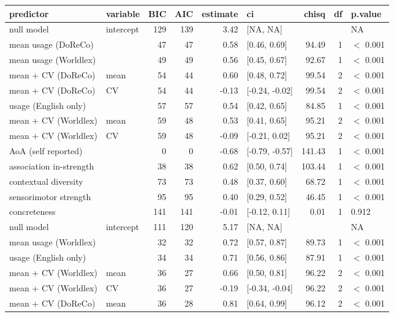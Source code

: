 \begin{table}[ht]
\centering
\begin{tabular}{llrrrlrrl}
  \hline
predictor & variable & BIC & AIC & estimate & ci & chisq & df & p.value \\ 
  \hline
null model & intercept & 129 & 139 & 3.42 & [NA, NA] &  &  & NA \\ 
  mean usage (DoReCo) &  & 47 & 47 & 0.58 & [0.46, 0.69] & 94.49 & 1 & $<$ 0.001 \\ 
  mean usage (Worldlex) &  & 49 & 49 & 0.56 & [0.45, 0.67] & 92.67 & 1 & $<$ 0.001 \\ 
  mean + CV (DoReCo) & mean & 54 & 44 & 0.60 & [0.48, 0.72] & 99.54 & 2 & $<$ 0.001 \\ 
  mean + CV (DoReCo) & CV & 54 & 44 & -0.13 & [-0.24, -0.02] & 99.54 & 2 & $<$ 0.001 \\ 
  usage (English only) &  & 57 & 57 & 0.54 & [0.42, 0.65] & 84.85 & 1 & $<$ 0.001 \\ 
  mean + CV (Worldlex) & mean & 59 & 48 & 0.53 & [0.41, 0.65] & 95.21 & 2 & $<$ 0.001 \\ 
  mean + CV (Worldlex) & CV & 59 & 48 & -0.09 & [-0.21, 0.02] & 95.21 & 2 & $<$ 0.001 \\ 
  AoA (self reported) &  & 0 & 0 & -0.68 & [-0.79, -0.57] & 141.43 & 1 & $<$ 0.001 \\ 
  association in-strength &  & 38 & 38 & 0.62 & [0.50, 0.74] & 103.44 & 1 & $<$ 0.001 \\ 
  contextual diversity &  & 73 & 73 & 0.48 & [0.37, 0.60] & 68.72 & 1 & $<$ 0.001 \\ 
  sensorimotor strength &  & 95 & 95 & 0.40 & [0.29, 0.52] & 46.45 & 1 & $<$ 0.001 \\ 
  concreteness &  & 141 & 141 & -0.01 & [-0.12, 0.11] & 0.01 & 1 & 0.912 \\ 
  null model & intercept & 111 & 120 & 5.17 & [NA, NA] &  &  & NA \\ 
  mean usage (Worldlex) &  & 32 & 32 & 0.72 & [0.57, 0.87] & 89.73 & 1 & $<$ 0.001 \\ 
  usage (English only) &  & 34 & 34 & 0.71 & [0.56, 0.86] & 87.91 & 1 & $<$ 0.001 \\ 
  mean + CV (Worldlex) & mean & 36 & 27 & 0.66 & [0.50, 0.81] & 96.22 & 2 & $<$ 0.001 \\ 
  mean + CV (Worldlex) & CV & 36 & 27 & -0.19 & [-0.34, -0.04] & 96.22 & 2 & $<$ 0.001 \\ 
  mean + CV (DoReCo) & mean & 36 & 28 & 0.81 & [0.64, 0.99] & 96.12 & 2 & $<$ 0.001 \\ 

\end{tabular}
\end{table}
